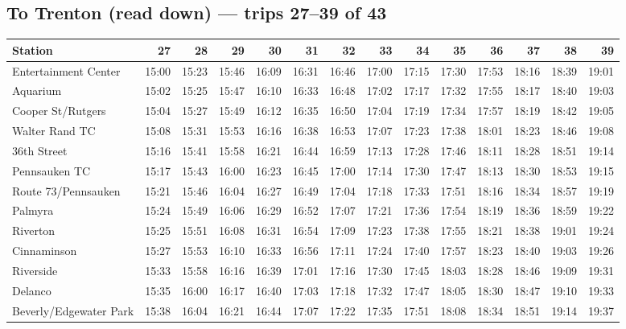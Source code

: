 \subsection*{To Trenton (read down) --- trips 27--39 of 43}
\begin{center}\footnotesize\setlength{\tabcolsep}{3pt}\begin{tabular}{@{}lrrrrrrrrrrrrr@{}}\toprule
Station & 27 & 28 & 29 & 30 & 31 & 32 & 33 & 34 & 35 & 36 & 37 & 38 & 39 \\\midrule
Entertainment Center & 15:00 & 15:23 & 15:46 & 16:09 & 16:31 & 16:46 & 17:00 & 17:15 & 17:30 & 17:53 & 18:16 & 18:39 & 19:01 \\
Aquarium & 15:02 & 15:25 & 15:47 & 16:10 & 16:33 & 16:48 & 17:02 & 17:17 & 17:32 & 17:55 & 18:17 & 18:40 & 19:03 \\
Cooper St/Rutgers & 15:04 & 15:27 & 15:49 & 16:12 & 16:35 & 16:50 & 17:04 & 17:19 & 17:34 & 17:57 & 18:19 & 18:42 & 19:05 \\
Walter Rand TC & 15:08 & 15:31 & 15:53 & 16:16 & 16:38 & 16:53 & 17:07 & 17:23 & 17:38 & 18:01 & 18:23 & 18:46 & 19:08 \\
36th Street & 15:16 & 15:41 & 15:58 & 16:21 & 16:44 & 16:59 & 17:13 & 17:28 & 17:46 & 18:11 & 18:28 & 18:51 & 19:14 \\
Pennsauken TC & 15:17 & 15:43 & 16:00 & 16:23 & 16:45 & 17:00 & 17:14 & 17:30 & 17:47 & 18:13 & 18:30 & 18:53 & 19:15 \\
Route 73/Pennsauken & 15:21 & 15:46 & 16:04 & 16:27 & 16:49 & 17:04 & 17:18 & 17:33 & 17:51 & 18:16 & 18:34 & 18:57 & 19:19 \\
Palmyra & 15:24 & 15:49 & 16:06 & 16:29 & 16:52 & 17:07 & 17:21 & 17:36 & 17:54 & 18:19 & 18:36 & 18:59 & 19:22 \\
Riverton & 15:25 & 15:51 & 16:08 & 16:31 & 16:54 & 17:09 & 17:23 & 17:38 & 17:55 & 18:21 & 18:38 & 19:01 & 19:24 \\
Cinnaminson & 15:27 & 15:53 & 16:10 & 16:33 & 16:56 & 17:11 & 17:24 & 17:40 & 17:57 & 18:23 & 18:40 & 19:03 & 19:26 \\
Riverside & 15:33 & 15:58 & 16:16 & 16:39 & 17:01 & 17:16 & 17:30 & 17:45 & 18:03 & 18:28 & 18:46 & 19:09 & 19:31 \\
Delanco & 15:35 & 16:00 & 16:17 & 16:40 & 17:03 & 17:18 & 17:32 & 17:47 & 18:05 & 18:30 & 18:47 & 19:10 & 19:33 \\
Beverly/Edgewater Park & 15:38 & 16:04 & 16:21 & 16:44 & 17:07 & 17:22 & 17:35 & 17:51 & 18:08 & 18:34 & 18:51 & 19:14 & 19:37 \\

\end{tabular}
\end{center}
